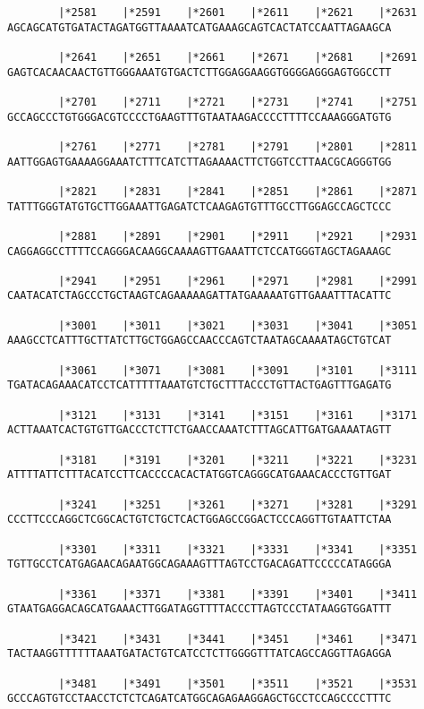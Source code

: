 \documentclass{article}
\begin{document}
\begin{Verbatim}
        |*2581    |*2591    |*2601    |*2611    |*2621    |*2631
AGCAGCATGTGATACTAGATGGTTAAAATCATGAAAGCAGTCACTATCCAATTAGAAGCA
  
        |*2641    |*2651    |*2661    |*2671    |*2681    |*2691
GAGTCACAACAACTGTTGGGAAATGTGACTCTTGGAGGAAGGTGGGGAGGGAGTGGCCTT
  
        |*2701    |*2711    |*2721    |*2731    |*2741    |*2751
GCCAGCCCTGTGGGACGTCCCCTGAAGTTTGTAATAAGACCCCTTTTCCAAAGGGATGTG
  
        |*2761    |*2771    |*2781    |*2791    |*2801    |*2811
AATTGGAGTGAAAAGGAAATCTTTCATCTTAGAAAACTTCTGGTCCTTAACGCAGGGTGG
  
        |*2821    |*2831    |*2841    |*2851    |*2861    |*2871
TATTTGGGTATGTGCTTGGAAATTGAGATCTCAAGAGTGTTTGCCTTGGAGCCAGCTCCC
  
        |*2881    |*2891    |*2901    |*2911    |*2921    |*2931
CAGGAGGCCTTTTCCAGGGACAAGGCAAAAGTTGAAATTCTCCATGGGTAGCTAGAAAGC
  
        |*2941    |*2951    |*2961    |*2971    |*2981    |*2991
CAATACATCTAGCCCTGCTAAGTCAGAAAAAGATTATGAAAAATGTTGAAATTTACATTC
  
        |*3001    |*3011    |*3021    |*3031    |*3041    |*3051
AAAGCCTCATTTGCTTATCTTGCTGGAGCCAACCCAGTCTAATAGCAAAATAGCTGTCAT
  
        |*3061    |*3071    |*3081    |*3091    |*3101    |*3111
TGATACAGAAACATCCTCATTTTTAAATGTCTGCTTTACCCTGTTACTGAGTTTGAGATG
  
        |*3121    |*3131    |*3141    |*3151    |*3161    |*3171
ACTTAAATCACTGTGTTGACCCTCTTCTGAACCAAATCTTTAGCATTGATGAAAATAGTT
  
        |*3181    |*3191    |*3201    |*3211    |*3221    |*3231
ATTTTATTCTTTACATCCTTCACCCCACACTATGGTCAGGGCATGAAACACCCTGTTGAT
  
        |*3241    |*3251    |*3261    |*3271    |*3281    |*3291
CCCTTCCCAGGCTCGGCACTGTCTGCTCACTGGAGCCGGACTCCCAGGTTGTAATTCTAA
  
        |*3301    |*3311    |*3321    |*3331    |*3341    |*3351
TGTTGCCTCATGAGAACAGAATGGCAGAAAGTTTAGTCCTGACAGATTCCCCCATAGGGA
  
        |*3361    |*3371    |*3381    |*3391    |*3401    |*3411
GTAATGAGGACAGCATGAAACTTGGATAGGTTTTACCCTTAGTCCCTATAAGGTGGATTT
  
        |*3421    |*3431    |*3441    |*3451    |*3461    |*3471
TACTAAGGTTTTTTAAATGATACTGTCATCCTCTTGGGGTTTATCAGCCAGGTTAGAGGA
  
        |*3481    |*3491    |*3501    |*3511    |*3521    |*3531
GCCCAGTGTCCTAACCTCTCTCAGATCATGGCAGAGAAGGAGCTGCCTCCAGCCCCTTTC
  

\end{Verbatim}
\end{document}
